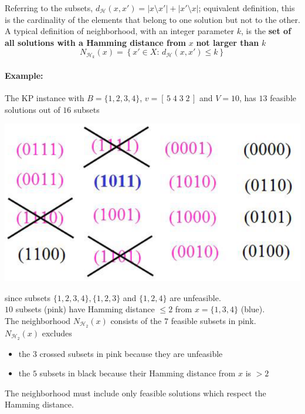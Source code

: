 Referring to the subsets, $d_{\mathcal{H}} (x, x') = |x \setminus x'| + |x' \setminus x|$; equivalent definition, this is the cardinality of the elements that belong to one solution but not to the other.\\

A typical definition of neighborhood, with an integer parameter $k$, is the \textbf{set of all solutions with a Hamming distance from} $x$ \textbf{not larger than} $k$
$$ N_{\mathcal{H}_k} (x) = \left\{x' \in X: \, d_{\mathcal{H}} (x, x') \leq k \right\} $$

\newpage

\paragraph{Example:} The KP instance with $B = \{1, 2, 3, 4\}$, $v = [\, 5 \; 4 \; 3 \; 2 \,]$ and $V = 10$, has $13$ feasible solutions out of $16$ subsets

\begin{center}
	\includegraphics[width=0.6\columnwidth]{img/KPN1}
\end{center}

since subsets $\{1, 2, 3, 4\}, \{1, 2, 3\}$ and $\{1, 2, 4\}$ are unfeasible.\\

$10$ subsets (pink) have Hamming distance $\leq 2$ from $x = \{1, 3, 4\}$ (blue).\\

The neighborhood $N_{\mathcal{H}_2} (x)$ consists of the $7$ feasible subsets in pink.\\
$N_{\mathcal{H}_2} (x)$ excludes
\begin{itemize}
	\item the $3$ crossed subsets in pink because they are unfeasible
	
	\item the $5$ subsets in black because their Hamming distance from $x$ is $> 2$
\end{itemize}

The neighborhood must include only feasible solutions which respect the Hamming distance.\\

